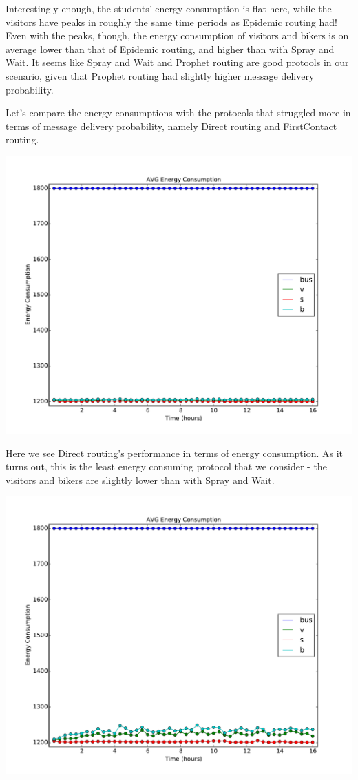 \documentclass[conference]{IEEEtran}
\begin{document}
Interestingly enough, the students' energy consumption is flat here, while the visitors have peaks in roughly the same time periods as Epidemic routing had! Even with the peaks, though, the energy consumption of visitors and bikers is on average lower than that of Epidemic routing, and higher than with Spray and Wait. It seems like Spray and Wait and Prophet routing are good protools in our scenario, given that Prophet routing had slightly higher message delivery probability.

Let's compare the energy consumptions with the protocols that struggled more in terms of message delivery probability, namely Direct routing and FirstContact routing.

\includegraphics[scale=0.38]{../one_1.5.1-RC2/plots/Direct_AVG_ENERGY_CONSUMPTION.pdf}

Here we see Direct routing's performance in terms of energy consumption. As it turns out, this is the least energy consuming protocol that we consider - the visitors and bikers are slightly lower than with Spray and Wait.

\includegraphics[scale=0.38]{../one_1.5.1-RC2/plots/FirstContact_AVG_ENERGY_CONSUMPTION.pdf}
\end{document}
